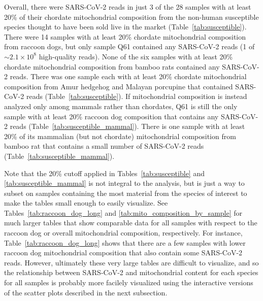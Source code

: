 \documentclass[9pt,twocolumn,twoside]{gsajnl_modified}
\begin{document}
 Overall, there were SARS-CoV-2 reads in just 3 of the 28 samples with at least 20\% of their chordate mitochondrial composition from the non-human susceptible species thought to have been sold live in the market (Table~\ref{tab:susceptible}).
There were 14 samples with at least 20\% chordate mitochondrial composition from raccoon dogs, but only sample Q61 contained any SARS-CoV-2 reads (1 of $\sim2.1 \times 10^8$ high-quality reads).
None of the six samples with at least 20\% chordate mitochondrial composition from bamboo rats contained any SARS-CoV-2 reads.
There was one sample each with at least 20\% chordate mitochondrial composition from Amur hedgehog and Malayan porcupine that contained SARS-CoV-2 reads (Table~\ref{tab:susceptible}).
If mitochondrial composition is instead analyzed only among mammals rather than chordates, Q61 is still the only sample with at least 20\% raccoon dog composition that contains any SARS-CoV-2 reads (Table~\ref{tab:susceptible_mammal}).
There is one sample with at least 20\% of its mammalian (but not chordate) mitochondrial composition from bamboo rat that contains a small number of SARS-CoV-2 reads (Table~\ref{tab:susceptible_mammal}).

Note that the 20\% cutoff applied in Tables~\ref{tab:susceptible} and \ref{tab:susceptible_mammal} is not integral to the analysis, but is just a way to subset on samples containing the most material from the species of interest to make the tables small enough to easily visualize.
See Tables~\ref{tab:raccoon_dog_long} and \ref{tab:mito_composition_by_sample} for much larger tables that show comparable data for all samples with respect to the raccoon dog or overall mitochondrial composition, respectively.
For instance, Table~\ref{tab:raccoon_dog_long} shows that there are a few samples with lower raccoon dog mitochondrial composition that also contain some SARS-CoV-2 reads.
However, ultimately these very large tables are difficult to visualize, and so the relationship between SARS-CoV-2 and mitochondrial content for each species for all samples is probably more facilely visualized using the interactive versions of the scatter plots described in the next subsection.
\end{document}
